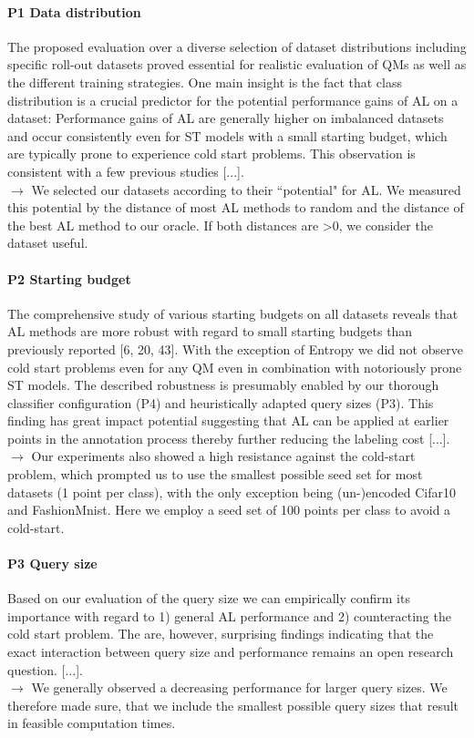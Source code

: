 \documentclass[]{article}
\begin{document}
\paragraph{P1 Data distribution} The proposed evaluation over a diverse selection of dataset distributions
including specific roll-out datasets proved essential for realistic evaluation of QMs as well as the
different training strategies. One main insight is the fact that class distribution is a crucial predictor
for the potential performance gains of AL on a dataset: Performance gains of AL are generally higher
on imbalanced datasets and occur consistently even for ST models with a small starting budget,
which are typically prone to experience cold start problems. This observation is consistent with a few
previous studies [...].\\
$\rightarrow$ We selected our datasets according to their ``potential" for AL. We measured this potential by the distance of most AL methods to random and the distance of the best AL method to our oracle. If both distances are >0, we consider the dataset useful.


\paragraph{P2 Starting budget} The comprehensive study of various starting budgets on all datasets reveals
that AL methods are more robust with regard to small starting budgets than previously reported
[6, 20, 43]. With the exception of Entropy we did not observe cold start problems even for any QM
even in combination with notoriously prone ST models. The described robustness is presumably
enabled by our thorough classifier configuration (P4) and heuristically adapted query sizes (P3). This
finding has great impact potential suggesting that AL can be applied at earlier points in the annotation
process thereby further reducing the labeling cost [...].\\
$\rightarrow$ Our experiments also showed a high resistance against the cold-start problem, which prompted us to use the smallest possible seed set for most datasets (1 point per class), with the only exception being (un-)encoded Cifar10 and FashionMnist. Here we employ a seed set of 100 points per class to avoid a cold-start.

\paragraph{P3 Query size} Based on our evaluation of the query size we can empirically confirm its importance
with regard to 1) general AL performance and 2) counteracting the cold start problem. The are,
however, surprising findings indicating that the exact interaction between query size and performance
remains an open research question. [...].\\
$\rightarrow$ We generally observed a decreasing performance for larger query sizes. We therefore made sure, that we include the smallest possible query sizes that result in feasible computation times.
\end{document}
